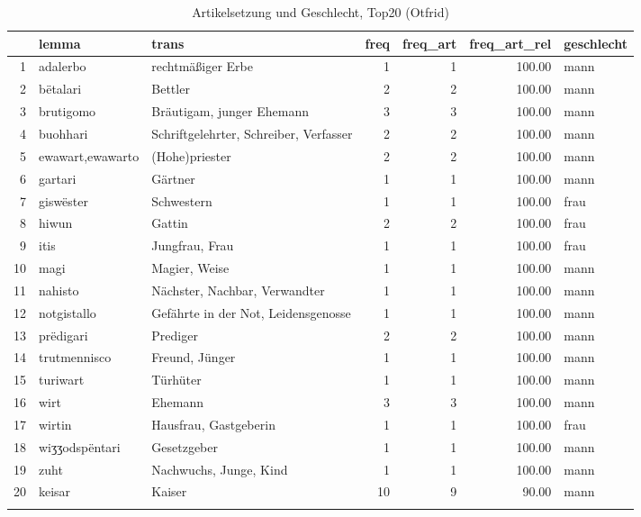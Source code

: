 \begin{table}[ht]
\centering
\begin{tabular}{rllrrrl}
  \lsptoprule
 & lemma & trans & freq & freq\_art & freq\_art\_rel & geschlecht \\ 
  \midrule
1 & adalerbo & rechtmäßiger Erbe &   1 &   1 & 100.00 & mann \\ 
  2 & bëtalari & Bettler &   2 &   2 & 100.00 & mann \\ 
  3 & brutigomo & Bräutigam, junger Ehemann &   3 &   3 & 100.00 & mann \\ 
  4 & buohhari & Schriftgelehrter, Schreiber, Verfasser &   2 &   2 & 100.00 & mann \\ 
  5 & ewawart,ewawarto & (Hohe)priester &   2 &   2 & 100.00 & mann \\ 
  6 & gartari & Gärtner &   1 &   1 & 100.00 & mann \\ 
  7 & giswëster & Schwestern &   1 &   1 & 100.00 & frau \\ 
  8 & hiwun & Gattin &   2 &   2 & 100.00 & frau \\ 
  9 & itis & Jungfrau, Frau &   1 &   1 & 100.00 & frau \\ 
  10 & magi & Magier, Weise &   1 &   1 & 100.00 & mann \\ 
  11 & nahisto & Nächster, Nachbar, Verwandter &   1 &   1 & 100.00 & mann \\ 
  12 & notgistallo & Gefährte in der Not, Leidensgenosse &   1 &   1 & 100.00 & mann \\ 
  13 & prëdigari & Prediger &   2 &   2 & 100.00 & mann \\ 
  14 & trutmennisco & Freund, Jünger &   1 &   1 & 100.00 & mann \\ 
  15 & turiwart & Türhüter &   1 &   1 & 100.00 & mann \\ 
  16 & wirt & Ehemann &   3 &   3 & 100.00 & mann \\ 
  17 & wirtin & Hausfrau, Gastgeberin &   1 &   1 & 100.00 & frau \\ 
  18 & wiʒʒodspëntari & Gesetzgeber &   1 &   1 & 100.00 & mann \\ 
  19 & zuht & Nachwuchs, Junge, Kind &   1 &   1 & 100.00 & mann \\ 
  20 & keisar & Kaiser &  10 &   9 & 90.00 & mann \\ 
   \lspbottomrule
\end{tabular}
\caption{Artikelsetzung und Geschlecht, Top20  (Otfrid)} 
\end{table}
